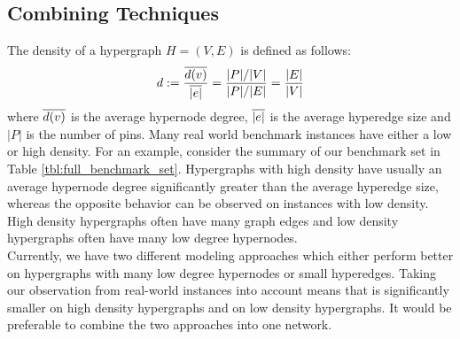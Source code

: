 \subsection{Combining Techniques}
\label{sec:hybrid_network}

The density of a hypergraph $H = (V,E)$ is defined as follows:
\[d := \frac{\overline{d(v)}}{\overline{|e|}} = \frac{|P|/|V|}{|P|/|E|} = \frac{|E|}{|V|}\]
where $\overline{d(v)}$ is the average hypernode degree, $\overline{|e|}$ is the average hyperedge
size and $|P|$ is the number of pins. Many real world benchmark instances have either a low 
or high density. For an example, consider the summary of our benchmark set in
Table \ref{tbl:full_benchmark_set}. Hypergraphs with high density have usually an average
hypernode degree significantly greater than the average hyperedge size, whereas the opposite
behavior can be observed on instances with low density. High density hypergraphs often have many
graph edges and low density hypergraphs often have many low degree
hypernodes. \\
Currently, we have two different modeling approaches which either perform better on hypergraphs with
many low degree hypernodes or small hyperedges. Taking our observation from real-world instances 
into account means that  is significantly smaller on high density hypergraphs
and  on low density hypergraphs. It would be preferable to combine 
the two approaches into one network. \\

